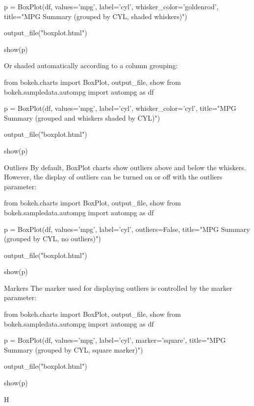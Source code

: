 p = BoxPlot(df, values='mpg', label='cyl', whisker_color='goldenrod',
            title="MPG Summary (grouped by CYL, shaded whiskers)")

output_file("boxplot.html")

show(p)
	
Or shaded automatically according to a column grouping:

from bokeh.charts import BoxPlot, output_file, show
from bokeh.sampledata.autompg import autompg as df

p = BoxPlot(df, values='mpg', label='cyl', whisker_color='cyl',
            title="MPG Summary (grouped and whiskers shaded by CYL)")

output_file("boxplot.html")

show(p)
	
Outliers
By default, BoxPlot charts show outliers above and below the whiskers. However, the display of outliers can be turned on or off with the outliers parameter:

from bokeh.charts import BoxPlot, output_file, show
from bokeh.sampledata.autompg import autompg as df

p = BoxPlot(df, values='mpg', label='cyl', outliers=False,
            title="MPG Summary (grouped by CYL, no outliers)")

output_file("boxplot.html")

show(p)
	
Markers
The marker used for displaying outliers is controlled by the marker parameter:

from bokeh.charts import BoxPlot, output_file, show
from bokeh.sampledata.autompg import autompg as df

p = BoxPlot(df, values='mpg', label='cyl', marker='square',
            title="MPG Summary (grouped by CYL, square marker)")

output_file("boxplot.html")

show(p)
	
H
